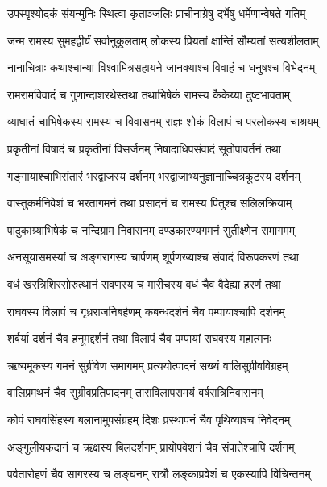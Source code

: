 \twolineshloka
{उपस्पृश्योदकं संयन्मुनिः स्थित्वा कृताञ्जलिः}
{प्राचीनाग्रेषु दर्भेषु धर्मेणान्वेषते गतिम्} %

\twolineshloka
{जन्म रामस्य सुमहद्वीर्यं सर्वानुकूलताम्}
{लोकस्य प्रियतां क्षान्तिं सौम्यतां सत्यशीलताम्} %

\twolineshloka
{नानाचित्राः कथाश्चान्या विश्वामित्रसहायने}
{जानक्याश्च विवाहं च धनुषश्च विभेदनम्} %

\twolineshloka
{रामरामविवादं च गुणान्दाशरथेस्तथा}
{तथाभिषेकं रामस्य कैकेय्या दुष्टभावताम्} %

\twolineshloka
{व्याघातं चाभिषेकस्य रामस्य च विवासनम्}
{राज्ञः शोकं विलापं च परलोकस्य चाश्रयम्} %

\twolineshloka
{प्रकृतीनां विषादं च प्रकृतीनां विसर्जनम्}
{निषादाधिपसंवादं सूतोपावर्तनं तथा} %

\twolineshloka
{गङ्गायाश्चाभिसंतारं भरद्वाजस्य दर्शनम्}
{भरद्वाजाभ्यनुज्ञानाच्चित्रकूटस्य दर्शनम्} %

\twolineshloka
{वास्तुकर्मनिवेशं च भरतागमनं तथा}
{प्रसादनं च रामस्य पितुश्च सलिलक्रियाम्} %

\twolineshloka
{पादुकाग्र्याभिषेकं च नन्दिग्राम निवासनम्}
{दण्डकारण्यगमनं सुतीक्ष्णेन समागमम्} %

\twolineshloka
{अनसूयासमस्यां च अङ्गरागस्य चार्पणम्}
{शूर्पणख्याश्च संवादं विरूपकरणं तथा} %

\twolineshloka
{वधं खरत्रिशिरसोरुत्थानं रावणस्य च}
{मारीचस्य वधं चैव वैदेह्या हरणं तथा} %

\twolineshloka
{राघवस्य विलापं च गृध्रराजनिबर्हणम्}
{कबन्धदर्शनं चैव पम्पायाश्चापि दर्शनम्} %

\twolineshloka
{शर्बर्या दर्शनं चैव हनूमद्दर्शनं तथा}
{विलापं चैव पम्पायां राघवस्य महात्मनः} %

\twolineshloka
{ऋष्यमूकस्य गमनं सुग्रीवेण समागमम्}
{प्रत्ययोत्पादनं सख्यं वालिसुग्रीवविग्रहम्} %

\twolineshloka
{वालिप्रमथनं चैव सुग्रीवप्रतिपादनम्}
{ताराविलापसमयं वर्षरात्रिनिवासनम्} %

\twolineshloka
{कोपं राघवसिंहस्य बलानामुपसंग्रहम्}
{दिशः प्रस्थापनं चैव पृथिव्याश्च निवेदनम्} %

\twolineshloka
{अङ्गुलीयकदानं च ऋक्षस्य बिलदर्शनम्}
{प्रायोपवेशनं चैव संपातेश्चापि दर्शनम्} %

\twolineshloka
{पर्वतारोहणं चैव सागरस्य च लङ्घनम्}
{रात्रौ लङ्काप्रवेशं च एकस्यापि विचिन्तनम्} %

